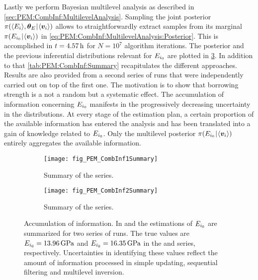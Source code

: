 Lastly we perform Bayesian multilevel analysis as described in \cref{sec:PEM:CombInf:MultilevelAnalysis}.
Sampling the joint posterior \(\pi(\langle{E_i}\rangle,\bm{\theta}_E {\:\!}|{\:\!} \langle{\bm{v}_i}\rangle)\) allows to straightforwardly extract samples
from its marginal \(\pi(E_{i_0} {\:\!}|{\:\!} \langle{\bm{v}_{i}}\rangle)\) in \cref{eq:PEM:CombInf:MultilevelAnalysis:Posterior}.
This is accomplished in \(t=\unit[4.57]{h}\) for \(N=10^7\) algorithm iterations.
The posterior and the previous inferential distributions relevant for \(E_{i_0}\) are plotted in \cref{fig:PEM:CombInf:Summary}.
In addition to that \cref{tab:PEM:CombInf:Summary} recapitulates the different approaches.
Results are also provided from a second series of runs that were independently carried out on top of the first one.
The motivation is to show that borrowing strength is a not a random but a systematic effect.
The accumulation of information concerning \(E_{i_0}\) manifests in the progressively decreasing uncertainty in the distributions.
At every stage of the estimation plan, a certain proportion of the available information has entered the analysis and has been translated into a gain of knowledge related to \(E_{i_0}\).
Only the multilevel posterior \(\pi(E_{i_0} {\:\!}|{\:\!} \langle{\bm{v}_{i}}\rangle)\) entirely aggregates the available information.
\begin{figure}[ht]
  \centering
  \begin{subfigure}[b]{0.5\textwidth}
    \centering
    \texttt{[image: fig\_PEM\_CombInf1Summary]}
    \caption{Summary of the  series.}
    \label{fig:PEM:CombInf:Summary:1}
  \end{subfigure}%
  \begin{subfigure}[b]{0.5\textwidth}
    \centering
    \texttt{[image: fig\_PEM\_CombInf2Summary]}
    \caption{Summary of the  series.}
    \label{fig:PEM:CombInf:Summary:2}
  \end{subfigure}%
  \caption[Accumulation of information]{Accumulation of information.
           In  and  the estimations of \(E_{i_0}\) are summarized for two series of runs.
           The true values are \(E_{\analyzed} = \unit[13.96]{GPa}\) and \(E_{\analyzed} = \unit[16.35]{GPa}\) in the  and  series, respectively.
           Uncertainties in identifying these values reflect the amount of information processed in simple updating, sequential filtering and multilevel inversion.
          }
  \label{fig:PEM:CombInf:Summary}
\end{figure}

